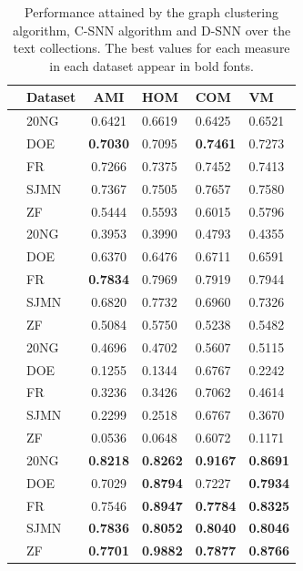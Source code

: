 \documentclass[preprint,12pt,authoryear,review]{elsarticle}
\begin{document}
\begin{table}[!htbp]
\centering
\begin{tabular}{cl|clll}
&\textbf{Dataset} & \textbf{AMI}  & \textbf{HOM} & \textbf{COM} & \textbf{VM} \\ \hline
\parbox[t]{2mm}{}&20NG   &  0.6421          &  0.6619          &  0.6425          & 0.6521  \\
&DOE    &  \textbf{0.7030} &  0.7095          &  \textbf{0.7461} & 0.7273  \\
&FR     &  0.7266          &  0.7375          &  0.7452          & 0.7413  \\
&SJMN   &  0.7367          &  0.7505          &  0.7657          & 0.7580  \\
&ZF     &  0.5444          &  0.5593          &  0.6015          & 0.5796  \\ \hline
\parbox[t]{2mm}{} &20NG   &  0.3953          &  0.3990          &  0.4793          & 0.4355\\
&DOE    &  0.6370          &  0.6476          &  0.6711          & 0.6591\\
&FR     &  \textbf{0.7834} &  0.7969          &  0.7919          & 0.7944\\
&SJMN   &  0.6820          &  0.7732          &  0.6960          & 0.7326\\
&ZF     & 0.5084           &  0.5750          &  0.5238          & 0.5482\\ \hline
\parbox[t]{2mm}{} 
&20NG   & 0.4696  &  0.4702 & 0.5607  & 0.5115  \\
&DOE    & 0.1255  &  0.1344 & 0.6767  & 0.2242  \\
&FR     & 0.3236  &  0.3426 & 0.7062  & 0.4614  \\
&SJMN   & 0.2299  &  0.2518 & 0.6767  & 0.3670  \\
&ZF     & 0.0536  &  0.0648 & 0.6072  & 0.1171  \\ \hline
\parbox[t]{2mm}{} &20NG   & \textbf{0.8218}  &  \textbf{0.8262} & \textbf{0.9167}  & \textbf{0.8691}  \\
&DOE    & 0.7029           &  \textbf{0.8794} & 0.7227           & \textbf{0.7934}  \\
&FR     & 0.7546           &  \textbf{0.8947} & \textbf{0.7784}  & \textbf{0.8325}  \\
&SJMN   & \textbf{0.7836}  &  \textbf{0.8052} & \textbf{0.8040}  & \textbf{0.8046}  \\
&ZF     & \textbf{0.7701}  &  \textbf{0.9882} & \textbf{0.7877}  & \textbf{0.8766}  \\ \hline
\end{tabular}
\caption{Performance attained by the graph clustering algorithm, C-SNN algorithm and D-SNN over the text collections. The best values for each measure in each dataset appear in bold fonts.}
\label{table:results}
\end{table}
\end{document}
